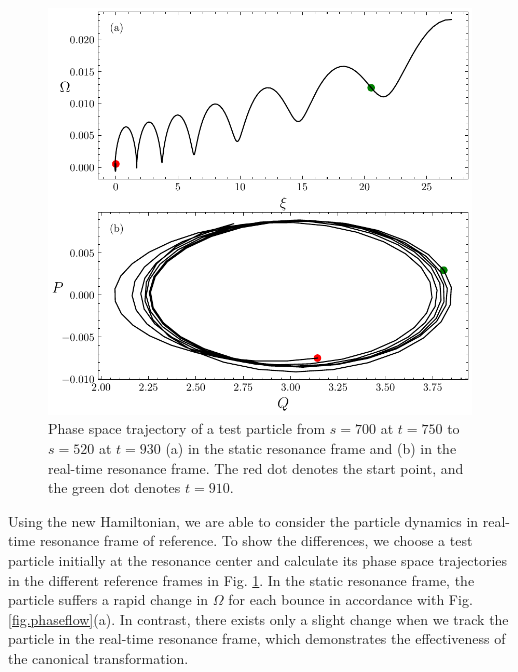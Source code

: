 \begin{figure}
    \centering
    \includegraphics[scale=0.5]{img/Trajectory.pdf}
    \caption{Phase space trajectory of a test particle from $s=700$ at $t=750$ to $s=520$ at $t=930$ (a)  in the static resonance frame and (b)  in the real-time resonance frame. The red dot denotes the start point, and the green dot denotes $t=910$.
    \label{fig.traj}
    }
\end{figure}
Using the new Hamiltonian, we are able to consider the particle dynamics in real-time resonance frame of reference.
To show the differences, we choose a test particle initially  at the resonance center and calculate its phase space trajectories in the different reference frames in  Fig. \ref{fig.traj}. 
In the static  resonance frame, the particle suffers a rapid change in $\Omega$ for each bounce in accordance with  Fig. \ref{fig.phaseflow}(a).
In contrast, there exists only a slight change when we track the particle in the real-time resonance frame, which demonstrates the effectiveness of the canonical transformation.



